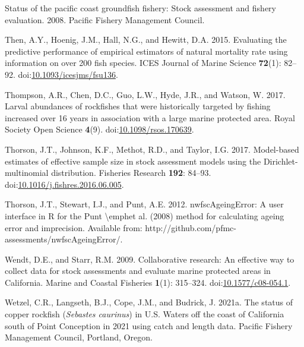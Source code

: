 \documentclass[11pt,
  english,
  letterpaper,
]{article}
\newlength{\cslhangindent}
\newenvironment{CSLReferences}[2] %
 {%
  \setlength{\parindent}{0pt}
  \ifodd #1 \everypar{\setlength{\hangindent}{\cslhangindent}}\ignorespaces\fi
  \ifnum #2 > 0
  \setlength{\parskip}{#2\baselineskip}
  \fi
 }%
 {}
\begin{document}
\begin{CSLReferences}{1}{0}
\leavevmode{}%
Status of the pacific coast groundfish fishery: Stock assessment and fishery evaluation. 2008. Pacific Fishery Management Council.

\leavevmode{}%
Then, A.Y., Hoenig, J.M., Hall, N.G., and Hewitt, D.A. 2015. Evaluating the predictive performance of empirical estimators of natural mortality rate using information on over 200 fish species. ICES Journal of Marine Science \textbf{72}(1): 82--92. doi:\href{https://doi.org/10.1093/icesjms/fsu136}{10.1093/icesjms/fsu136}.

\leavevmode{}%
Thompson, A.R., Chen, D.C., Guo, L.W., Hyde, J.R., and Watson, W. 2017. Larval abundances of rockfishes that were historically targeted by fishing increased over 16 years in association with a large marine protected area. Royal Society Open Science \textbf{4}(9). doi:\href{https://doi.org/10.1098/rsos.170639}{10.1098/rsos.170639}.

\leavevmode{}%
Thorson, J.T., Johnson, K.F., Methot, R.D., and Taylor, I.G. 2017. Model-based estimates of effective sample size in stock assessment models using the {Dirichlet}-multinomial distribution. Fisheries Research \textbf{192}: 84--93. doi:\href{https://doi.org/10.1016/j.fishres.2016.06.005}{10.1016/j.fishres.2016.06.005}.

\leavevmode{}%
Thorson, J.T., Stewart, I.J., and Punt, A.E. 2012. {nwfscAgeingError}: A user interface in {R} for the {Punt} {\textbackslash{}}emphet al. (2008) method for calculating ageing error and imprecision. Available from: http://github.com/pfmc-assessments/nwfscAgeingError/.

\leavevmode{}%
Wendt, D.E., and Starr, R.M. 2009. Collaborative research: An effective way to collect data for stock assessments and evaluate marine protected areas in {California}. Marine and Coastal Fisheries \textbf{1}(1): 315--324. doi:\href{https://doi.org/10.1577/c08-054.1}{10.1577/c08-054.1}.

\leavevmode{}%
Wetzel, C.R., Langseth, B.J., Cope, J.M., and Budrick, J. 2021a. The status of copper rockfish (\emph{{Sebastes} caurinus}) in {U}.{S}. Waters off the coast of {California} south of {Point} {Conception} in 2021 using catch and length data. Pacific Fishery Management Council, Portland, Oregon.


\end{CSLReferences}
\end{document}
